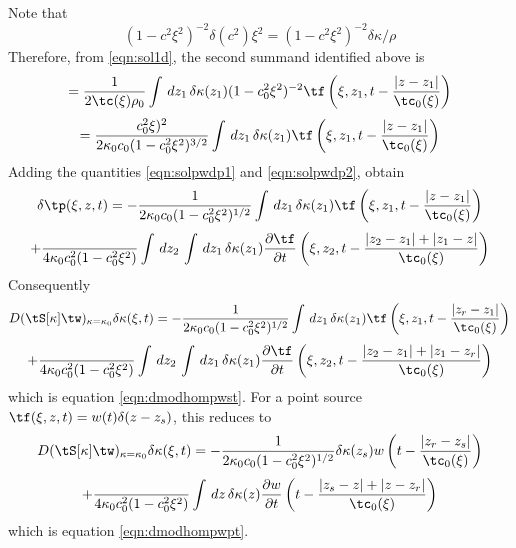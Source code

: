 Note that
\[
  (1-c^2\xi^2)^{-2}\delta (c^2)\xi^2= (1-c^2\xi^2)^{-2}\delta \kappa
  /\rho
\]
Therefore, from \ref{eqn:sol1d}, the second summand identified above
is
\[
  =\frac{1}{2\tc(\xi)\rho_0}\int \,dz_1\, \delta 
\kappa(z_1)(1-c_0^2\xi^2)^{-2} \tf \left(\xi,z_1,t - \frac{|z-z_1|}{\tc_0(\xi)}\right)
\]
\begin{equation}
  \label{eqn:solpwdp2}
=\frac{c_0^2\xi)^2}{2\kappa_0c_0(1-c_0^2\xi^2)^{3/2}}\int \,dz_1\, \delta 
\kappa(z_1) \tf \left(\xi,z_1,t - \frac{|z-z_1|}{\tc_0(\xi)}\right)
\end{equation}
Adding the quantities \ref{eqn:solpwdp1} and \ref{eqn:solpwdp2},
obtain
\[
  \delta \tp(\xi,z,t) = -\frac{1}{2\kappa_0c_0(1-c_0^2\xi^2)^{1/2}}\int \,dz_1\, \delta 
  \kappa(z_1) \tf \left(\xi,z_1,t - \frac{|z-z_1|}{\tc_0(\xi)}\right)
  \]
\begin{equation}
  \label{eqn:solpwdp}
  + \frac{}{4\kappa_0c_0^2(1-c_0^2\xi^2)} \int\,dz_2 \, \int \,dz_1\,\delta 
  \kappa(z_1)  \frac{\partial \tf}{\partial
    t}\left(\xi,z_2,t - \frac{|z_2-z_1|+|z_1-z|}{\tc_0(\xi)}\right)
  \end{equation}
Consequently 
\[
  D(\tS[\kappa]\tw)_{\kappa=\kappa_0}\delta \kappa(\xi,t) =
  -\frac{1}{2\kappa_0c_0(1-c_0^2\xi^2)^{1/2}}\int \,dz_1\, \delta 
  \kappa(z_1) \tf \left(\xi,z_1,t - \frac{|z_r-z_1|}{\tc_0(\xi)}\right)
\]
\begin{equation}
  \label{eqn:dmodhomst1}
    + \frac{}{4\kappa_0c_0^2(1-c_0^2\xi^2)} \int\,dz_2 \, \int \,dz_1\,\delta 
  \kappa(z_1)  \frac{\partial \tf}{\partial
    t}\left(\xi,z_2,t - \frac{|z_2-z_1|+|z_1-z_r|}{\tc_0(\xi)}\right)
\end{equation}
which is equation \ref{eqn:dmodhompwst}. For a point source
$\tf(\xi,z,t) = w(t)\delta(z-z_s)$, this reduces to
\[
  D(\tS[\kappa]\tw)_{\kappa=\kappa_0}\delta \kappa(\xi,t) =
  -\frac{1}{2\kappa_0c_0(1-c_0^2\xi^2)^{1/2}} \delta 
  \kappa(z_s) w\left(t - \frac{|z_r-z_s|}{\tc_0(\xi)}\right)
\]
\begin{equation}
  \label{eqn:dmodhompt1}
    + \frac{}{4\kappa_0c_0^2(1-c_0^2\xi^2)} \int \,dz\,\delta 
  \kappa(z) \frac{\partial w}{\partial
    t}\left(t - \frac{|z_s-z|+|z-z_r|}{\tc_0(\xi)}\right)
\end{equation}
which is equation \ref{eqn:dmodhompwpt}. 



